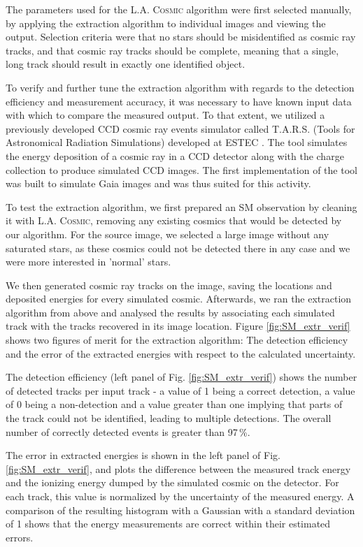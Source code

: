 \documentclass[a4paper, 11pt]{article}
\begin{document}
The parameters used for the \textsc{L.A. Cosmic} algorithm were first selected manually, by applying the extraction algorithm to individual images and viewing the output. Selection criteria were that no stars should be misidentified as cosmic ray tracks, and that cosmic ray tracks should be complete, meaning that a single, long track should result in exactly one identified object.

To verify and further tune the extraction algorithm with regards to the detection efficiency and measurement accuracy, it was necessary to have known input data with which to compare the measured output. To that extent, we utilized a previously developed CCD cosmic ray events simulator called T.A.R.S. (Tools for Astronomical Radiation Simulations) developed at ESTEC \cite{TARS}. The tool simulates the energy deposition of a cosmic ray in a CCD detector along with the charge collection to produce simulated CCD images. The first implementation of the tool was built to simulate Gaia images and was thus suited for this activity.

To test the extraction algorithm, we first prepared an SM observation by cleaning it with \textsc{L.A. Cosmic}, removing any existing cosmics that would be detected by our algorithm. For the source image, we selected a large image without any saturated stars, as these cosmics could not be detected there in any case and we were more interested in 'normal' stars.

We then generated cosmic ray tracks on the image, saving the locations and deposited energies for every simulated cosmic. Afterwards, we ran the extraction algorithm from above and analysed the results by associating each simulated track with the tracks recovered in its image location. Figure \ref{fig:SM_extr_verif} shows two figures of merit for the extraction algorithm: The detection efficiency and the error of the extracted energies with respect to the calculated uncertainty.

The detection efficiency (left panel of Fig. \ref{fig:SM_extr_verif}) shows the number of detected tracks per input track - a value of 1 being a correct detection, a value of 0 being a non-detection and a value greater than one implying that parts of the track could not be identified, leading to multiple detections. The overall number of correctly detected events is greater than 97\,\%.

The error in extracted energies is shown in the left panel of Fig. \ref{fig:SM_extr_verif}, and plots the difference between the measured track energy and the ionizing energy dumped by the simulated cosmic on the detector. For each track, this value is normalized by the uncertainty of the measured energy. A comparison of the resulting histogram with a Gaussian with a standard deviation of 1 shows that the energy measurements are correct within their estimated errors.
\end{document}
